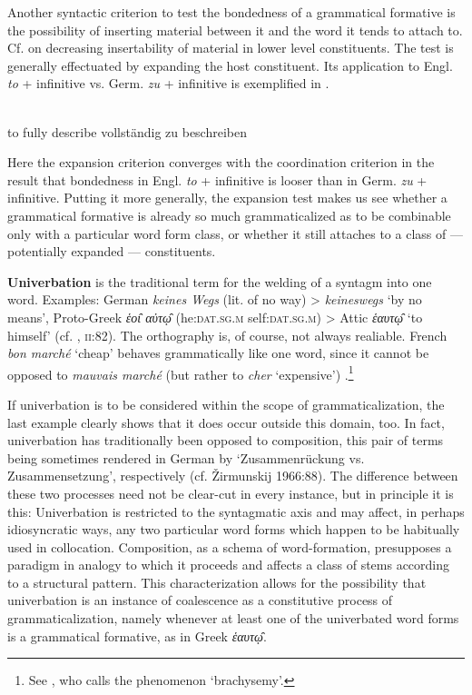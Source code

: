 Another syntactic criterion to test the bondedness of a grammatical formative is the possibility of inserting material between it and the word it tends to attach to. Cf. \citet{Zwicky1978} on decreasing insertability of material in lower level constituents. The test is generally effectuated by expanding the host constituent. Its application to Engl. \textit{to} + infinitive vs. Germ. \textit{zu} + infinitive is exemplified in .

\ea\label{ex:}
\langinfo{\LangGerm}{}{}\\
  to fully describe
vollständig zu beschreiben\\
\z

Here the expansion criterion converges with the coordination criterion in the result that bondedness in Engl. \textit{to} + infinitive is looser than in Germ. \textit{zu} + infinitive. Putting it more generally, the expansion test makes us see whether a grammatical formative is already so much grammaticalized as to be combinable only with a particular word form class, or whether it still attaches to a class of — potentially expanded — constituents.

\textbf{Univerbation} is the traditional term for the welding of a syntagm into one word. Examples: German \textit{keines Wegs} (lit. of no way) {\textgreater} \textit{keineswegs} ‘by no means’, Proto-Greek \textit{ἑο\newtie{ɩ} αὐτ\newtie{ῳ}} (he:\textsc{dat.sg.m} self:\textsc{dat.sg.m}) {\textgreater} Attic \textit{ἑαυτ\newtie{ῳ}} ‘to himself’ (cf. \citet{Wackernagel1924}, \textsc{ii}:82). The orthography is, of course, not always realiable. French \textit{bon marché} ‘cheap’ behaves grammatically like one word, since it cannot be opposed to \textit{mauvais marché} (but rather to \textit{cher} ‘expensive’)%
.\footnote{See \citet[109f]{Frei1929}, who calls the phenomenon ‘brachysemy’.}

If univerbation is to be considered within the scope of grammaticalization, the last example clearly shows that it does occur outside this domain, too. In fact, univerbation has traditionally been opposed to composition, this pair of terms being sometimes rendered in German by ‘Zusammenrückung vs. Zusammensetzung’, respectively (cf. Žirmunskij 1966:88). The difference between these two processes need not be clear-cut in every instance, but in principle it is this: Univerbation is restricted to the syntagmatic axis and may affect, in perhaps idiosyncratic ways, any two particular word forms which happen to be habitually used in collocation. Composition, as a schema of word-formation, presupposes a paradigm in analogy to which it proceeds and affects a class of stems according to a structural pattern. This characterization allows for the possibility that univerbation is an instance of coalescence as a constitutive process of grammaticalization, namely whenever at least one of the univerbated word forms is a grammatical formative, as in Greek \textit{ἑαυτ\newtie{ῳ}}.

